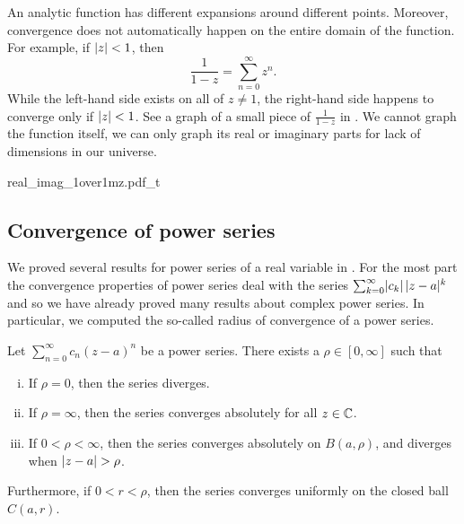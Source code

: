 An analytic function has different expansions around different points.
Moreover, convergence does not automatically happen on the entire
domain of the function.  For example, if $\lvert {z} \rvert < 1$, then
\begin{equation*}
\frac{1}{1-z} = \sum_{n=0}^\infty z^n .
\end{equation*}
While the left-hand side exists on all of $z \not= 1$, the right-hand side
happens to converge only if $\lvert {z} \rvert < 1$.  See a graph
of a small piece of $\frac{1}{1-z}$ in .
We cannot graph the
function itself, we can only graph its real or imaginary parts for lack
of dimensions in our universe.

\begin{myfigureht}
{real_imag_1over1mz.pdf_t}
\caption{Graphs of the real and imaginary parts of $z=x+iy \mapsto \frac{1}{1-z}$
in the square $[-0.8,0.8]^2$.  The singularity at $z=1$ is marked with a
vertical dashed line.\label{fig:1over1mz}}
\end{myfigureht}

\subsection{Convergence of power series}

We proved several results for power series of a real variable in
.   For the most part the convergence
properties of power series deal with the series
$\sum_{k=0}^\infty \lvert {c_k} \rvert \, \lvert {z-a} \rvert^k$
and so we have already proved many results about complex power
series.  In particular, we computed the so-called
radius of convergence of a power series.

\begin{prop}
\pagebreak[2]
Let $\sum_{n=0}^\infty c_n {(z-a)}^n$ be a power series.
There exists a $\rho \in [0,\infty]$ such that
\begin{enumerate}[(i)]
\item If $\rho = 0$, then the series diverges.
\item If $\rho = \infty$, then the series converges absolutely for all $z \in {\mathbb{C}}$.
\item If $0 < \rho < \infty$, then the
series converges absolutely on $B(a,\rho)$,
and diverges when $\lvert {z-a} \rvert > \rho$.
\end{enumerate}
Furthermore, if $0 < r < \rho$, then
the series converges uniformly on the closed ball $C(a,r)$.
\end{prop}

